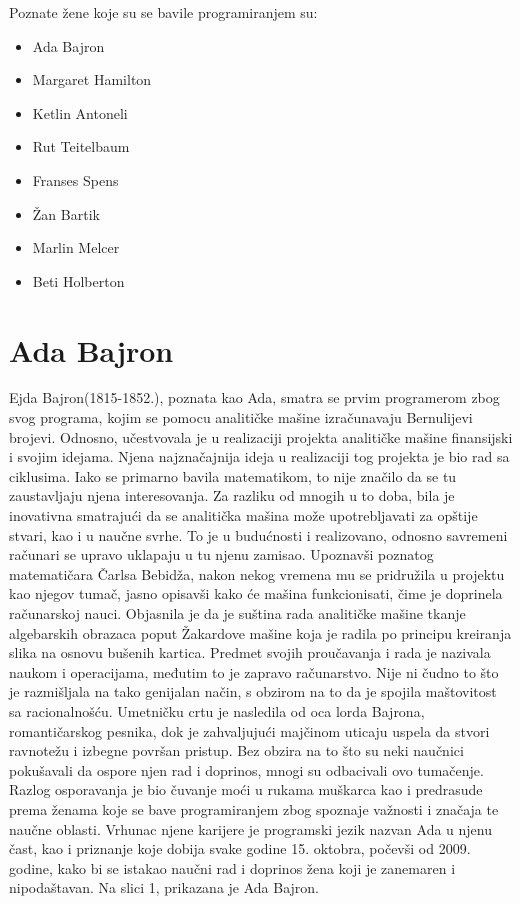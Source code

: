 \documentclass[a4paper,12pt]{article}
\begin{document}
\begin{flushleft}Poznate žene koje su se bavile programiranjem su:
\end{flushleft}
\begin{itemize}
\item Ada Bajron
\item Margaret Hamilton
\item Ketlin Antoneli
\item Rut Teitelbaum
\item Franses Spens
\item Žan Bartik
\item Marlin Melcer
\item Beti Holberton
\end{itemize}

\section{Ada Bajron}

\begin{flushleft}
    Ejda Bajron(1815-1852.), poznata kao Ada, smatra se prvim programerom zbog svog programa, kojim se pomocu analitičke mašine izračunavaju Bernulijevi brojevi. Odnosno, učestvovala je u realizaciji projekta analitičke mašine finansijski i svojim idejama. Njena najznačajnija ideja u realizaciji tog projekta je bio rad sa ciklusima. Iako se primarno bavila matematikom, to nije značilo da se tu zaustavljaju njena interesovanja. Za razliku od mnogih u to doba, bila je inovativna smatrajući da se analitička mašina može upotrebljavati za opštije stvari, kao i u naučne svrhe. To je u budućnosti i realizovano, odnosno savremeni računari se upravo uklapaju u tu njenu zamisao. Upoznavši poznatog matematičara Čarlsa Bebidža, nakon nekog vremena mu se pridružila u projektu kao njegov tumač, jasno opisavši kako će mašina funkcionisati, čime je doprinela računarskoj nauci. Objasnila je da je suština rada analitičke mašine tkanje algebarskih obrazaca poput Žakardove mašine koja je radila po principu kreiranja slika na osnovu bušenih kartica. Predmet svojih proučavanja i rada je nazivala naukom i operacijama, međutim to je zapravo računarstvo. Nije ni čudno to što je razmišljala na tako genijalan način, s obzirom na to da je spojila maštovitost sa racionalnošću. Umetničku crtu je nasledila od oca lorda Bajrona, romantičarskog pesnika, dok je zahvaljujući majčinom uticaju uspela da stvori ravnotežu i izbegne površan pristup. Bez obzira na to što su neki naučnici pokušavali da ospore njen rad i doprinos, mnogi su odbacivali ovo tumačenje. Razlog osporavanja je bio čuvanje moći u rukama muškarca kao i predrasude prema ženama koje se bave programiranjem zbog spoznaje važnosti i značaja te naučne oblasti. Vrhunac njene karijere je programski jezik nazvan Ada u njenu čast, kao i priznanje koje dobija svake godine 15. oktobra, počevši od 2009. godine, kako bi se istakao naučni rad i doprinos žena koji je zanemaren i nipodaštavan. Na slici 1, prikazana je Ada Bajron.
\end{flushleft}
\end{document}
